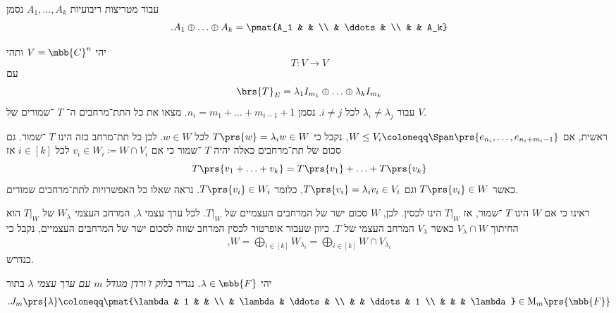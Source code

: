 \documentclass[a4paper,10pt,twoside,openany]{book}
\renewcommand{\Mat}{\mathrm{M}}
\begin{document}
\begin{notation}
עבור מטריצות ריבועיות
$A_1, \ldots, A_k$
נסמן
\[\text{.} A_1 \oplus \ldots \oplus A_k = \pmat{A_1 & & \\ & \ddots & \\ & & A_k}\]
\end{notation}

\begin{exercisechap}
יהי
$V = \mbb{C}^n$
ותהי
\[T \colon V \to V\]
עם
\[\brs{T}_E = \lambda_1 I_{m_1} \oplus \ldots \oplus \lambda_k I_{m_k}\]
עבור
$\lambda_i \neq \lambda_j$
לכל
$i \neq j$.
נסמן
$n_i = m_1 + \ldots + m_{i-1} + 1$.
מצאו את כל התת־מרחבים ה־%
$T$%
־שמורים של
$V$.
\end{exercisechap}

\begin{solution}
ראשית, אם
$W \leq V_i \coloneqq \Span\prs{e_{n_i}, \ldots, e_{n_i + m_i - 1}}$,
נקבל כי
$T\prs{w} = \lambda_i w \in W$
לכל
$w \in W$.
לכן כל תת־מרחב כזה הינו
$T$%
־שמור.
גם סכום של תת־מרחבים כאלה יהיה
$T$%
־שמור כי אם
$v_i \in W_i \coloneqq W \cap V_i$
לכל
$i \in [k]$
אז
\[T\prs{v_1 + \ldots + v_k} = T\prs{v_1} + \ldots + T\prs{v_k}\]
כאשר
$T\prs{v_i} \in W$
וגם
$T\prs{v_i} = \lambda_i v_i \in V_i$,
כלומר
$T\prs{v_i} \in W_i$.
נראה שאלו כל האפשרויות לתת־מרחבים שמורים.

ראינו כי אם
$W$
הינו
$T$%
־שמור, אז
$\left. T \right|_W$
הינו לכסין.
לכן,
$W$
סכום ישר של המרחבים העצמיים של
$\left. T \right|_W$.
לכל ערך עצמי
$\lambda$,
המרחב העצמי
$W_{\lambda}$
של
$\left. T \right|_W$
הוא החיתוך
$V_\lambda \cap W$
כאשר
$V_\lambda$
המרחב העצמי של
$T$.
כיוון שעבור אופרטור לכסין המרחב שווה לסכום ישר של המרחבים העצמיים, נקבל כי
\begin{align*}
\text{,} W = \bigoplus_{i \in [k]} W_{\lambda_i} = \bigoplus_{i \in [k]} W \cap V_{\lambda_i}
\end{align*}
כנדרש.
\end{solution}

\begin{definition}
יהי
$\lambda \in \mbb{F}$.
נגדיר
\emph{בלוק ז'ורדן מגודל
$m$
עם ערך עצמי
$\lambda$}
בתור
\begin{align*}
\text{.} J_m\prs{\lambda} \coloneqq \pmat{\lambda & 1 & & \\ & \lambda & \ddots & \\ & & \ddots & 1 \\ & & & \lambda} \in \Mat_m\prs{\mbb{F}}
\end{align*}
\end{definition}
\end{document}
